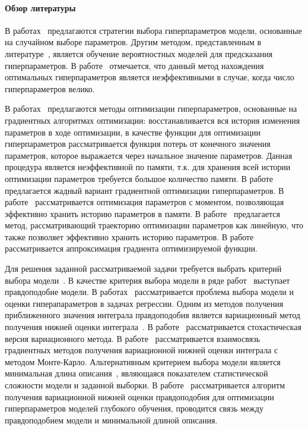 \documentclass[12pt]{article}
\begin{document}
\paragraph{Обзор литературы}
В работах~\cite{random1, random2} предлагаются стратегии выбора гиперпараметров модели, основанные на случайном выборе параметров. Другим методом, представленным в литературе~\cite{probopt1, probopt2}, является обучение вероятностных моделей для предсказания гиперпараметров. В работе~\cite{hyper} отмечается, что данный метод нахождения оптимальных гиперпараметров является неэффективными в случае, когда число гиперпараметров велико. 

В работах~\cite{hyper, hyper2,  hyper_mad, hyper_hoag, hyper_greed} предлагаются методы оптимизации гиперпараметров, основанные на градиентных алгоритмах оптимизации: восстанавливается вся история изменения параметров в ходе оптимизации, в качестве функции для оптимизации гиперпараметров рассматривается функция потерь от конечного значения параметров, которое выражается через начальное значение параметров. Данная процедура является неэффективной по памяти, т.к. для хранения всей истории оптимизации параметров требуется большое количество памяти. В работе~\cite{hyper_greed} предлагается жадный вариант градиентной оптимизации гиперпараметров. В работе~\cite{hyper} рассматривается оптимизация параметров с моментом, позволяющая эффективно хранить историю параметров в памяти. В работе~\cite{hyper_mad} предлагается метод, рассматривающий траекторию оптимизации параметров как линейную, что также позволяет эффективно хранить историю параметров. В работе~\cite{hyper_hoag} рассматривается аппроксимация градиента оптимизируемой функции. 

Для решения заданной рассматриваемой задачи требуется выбрать критерий выбора модели~\cite{MacKay,Bishop}. 
В качестве критерия выбора модели в ряде работ~\cite{MacKay,Bishop,tokmakova,zaitsev, strijov_dsc} выступает правдоподобие модели. В работах~\cite{tokmakova,zaitsev, strijov_dsc} рассматривается проблема выбора модели и оценки гиперапараметров в задачах регрессии. Одним из методов получения приближенного значения интеграла правдоподобия является вариационный метод получения нижней оценки интеграла~\cite{Bishop}. В работе~\cite{hoffman} рассматривается стохастическая версия вариационного метода.  В работе~\cite{varmc} рассматривается взаимосвязь градиентных методов получения вариационной нижней оценки интеграла с методом Монте-Карло.  Альтернативным критерием выбора модели является минимальная длина описания~\cite{mdl}, являющаяся показателем статистической сложности модели и заданной выборки. В работе~\cite{nips} рассматривается алгоритм получения вариационной нижней оценки правдоподобия  для оптимизации гиперпараметров моделей глубокого обучения, проводится связь между правдоподобием модели и минимальной длиной описания. 
\end{document}

